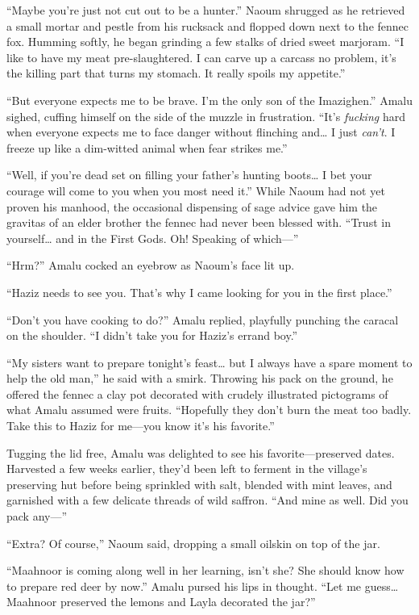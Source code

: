 ``Maybe you're just not cut out to be a hunter.'' Naoum shrugged as he retrieved a small mortar and pestle from his rucksack and flopped down next to the fennec fox. Humming softly, he began grinding a few stalks of dried sweet marjoram. ``I like to have my meat pre-slaughtered. I can carve up a carcass no problem, it's the killing part that turns my stomach. It really spoils my appetite.''

``But everyone expects me to be brave. I'm the only son of the Imazighen.'' Amalu sighed, cuffing himself on the side of the muzzle in frustration. ``It's \emph{fucking} hard when everyone expects me to face danger without flinching and\ldots{} I just \emph{can't}. I freeze up like a dim-witted animal when fear strikes me.''

``Well, if you're dead set on filling your father's hunting boots\ldots{} I bet your courage will come to you when you most need it.'' While Naoum had not yet proven his manhood, the occasional dispensing of sage advice gave him the gravitas of an elder brother the fennec had never been blessed with. ``Trust in yourself\ldots{} and in the First Gods. Oh! Speaking of which---''

``Hrm?'' Amalu cocked an eyebrow as Naoum's face lit up.

``Haziz needs to see you. That's why I came looking for you in the first place.''

``Don't you have cooking to do?'' Amalu replied, playfully punching the caracal on the shoulder. ``I didn't take you for Haziz's errand boy.''

``My sisters want to prepare tonight's feast\ldots{} but I always have a spare moment to help the old man,'' he said with a smirk. Throwing his pack on the ground, he offered the fennec a clay pot decorated with crudely illustrated pictograms of what Amalu assumed were fruits. ``Hopefully they don't burn the meat too badly. Take this to Haziz for me---you know it's his favorite.''

Tugging the lid free, Amalu was delighted to see his favorite---preserved dates. Harvested a few weeks earlier, they'd been left to ferment in the village's preserving hut before being sprinkled with salt, blended with mint leaves, and garnished with a few delicate threads of wild saffron. ``And mine as well. Did you pack any---''

``Extra? Of course,'' Naoum said, dropping a small oilskin on top of the jar.

``Maahnoor is coming along well in her learning, isn't she? She should know how to prepare red deer by now.'' Amalu pursed his lips in thought. ``Let me guess\ldots{} Maahnoor preserved the lemons and Layla decorated the jar?''

